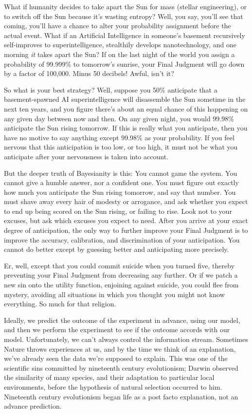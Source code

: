 {
 What if humanity decides to take apart the Sun for mass (stellar
engineering), or to switch off the Sun because it's
wasting entropy? Well, you say, you'll see that coming,
you'll have a chance to alter your probability
assignment before the actual event. What if an Artificial Intelligence
in someone's basement recursively self-improves to
superintelligence, stealthily develops nanotechnology, and one morning
\textit{it} takes apart the Sun? If on the last night of the world you
assign a probability of 99.999\% to tomorrow's sunrise,
your Final Judgment will go down by a factor of 100,000. Minus 50
decibels! Awful, isn't it?}

{
 So what is your best strategy? Well, suppose you 50\% anticipate
that a basement-spawned AI superintelligence will disassemble the Sun
sometime in the next ten years, and you figure there's
about an equal chance of this happening on any given day between now
and then. On any given night, you would 99.98\% anticipate the Sun
rising tomorrow. If this is really what you anticipate, then you have
no motive to say anything except 99.98\% as your probability. If you
feel nervous that this anticipation is too low, or too high, it must
not be what you anticipate after your nervousness is taken into
account.}

{
 But the deeper truth of Bayesianity is this: You cannot game the
system. You cannot give a humble answer, nor a confident one. You must
figure out exactly how much you anticipate the Sun rising tomorrow, and
say that number. You must shave away every hair of modesty or
arrogance, and ask whether you expect to end up being scored on the Sun
rising, or failing to rise. Look not to your excuses, but ask which
excuses you expect to need. After you arrive at your exact degree of
anticipation, the only way to further improve your Final Judgment is to
improve the accuracy, calibration, and discrimination of your
anticipation. You cannot do better except by guessing better and
anticipating more precisely.}

{
 Er, well, except that you could commit suicide when you turned
five, thereby preventing your Final Judgment from decreasing any
further. Or if we patch a new sin onto the utility function, enjoining
against suicide, you could flee from mystery, avoiding all situations
in which you thought you might not know everything. So much for that
religion.}

{
 Ideally, we predict the outcome of the experiment in advance,
using our model, and then we perform the experiment to see if the
outcome accords with our model. Unfortunately, we can't
always control the information stream. Sometimes Nature throws
experiences at us, and by the time we think of an explanation,
we've already seen the data we're
supposed to explain. This was one of the scientific sins committed by
nineteenth century evolutionism; Darwin observed the similarity of many
species, and their adaptation to particular local environments, before
the hypothesis of natural selection occurred to him. Nineteenth century
evolutionism began life as a post facto explanation, not an advance
prediction.}


